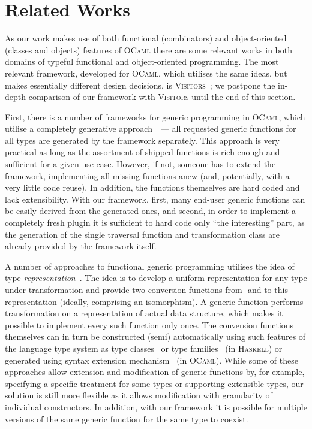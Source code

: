 \section{Related Works}

As our work makes use of both functional (combinators) and object-oriented (classes and objects) features of \textsc{OCaml} there are some relevant works
in both domains of typeful functional and object-oriented programming. The most relevant framework, developed for \textsc{OCaml}, which utilises the same
ideas, but makes essentially different design decisions, is \textsc{Visitors}~\cite{Visitors}; we postpone the in-depth comparison of our framework with
\textsc{Visitors} until the end of this section.

First, there is a number of frameworks for generic programming in \textsc{OCaml}, which utilise a completely generative approach~\cite{Yallop,PPXLib}~---
all requested generic functions for all types are generated by the framework separately. This approach is very practical as long as the assortment
of shipped functions is rich enough and sufficient for a given use case. However, if not, someone has to extend the framework, implementing
all missing functions anew (and, potentially, with a very little code reuse). In addition, the functions themselves are hard coded and
lack extensibility. With our framework, first, many end-user generic functions can be easily derived from the generated ones, and second, in order to
implement a completely fresh plugin it is sufficient to hard code only ``the interesting'' part, as the generation of the single traversal
function and transformation class are already provided by the framework itself.

A number of approaches to functional generic programming utilises the idea of type \emph{representation}~\cite{Hinze}.
The idea is to develop a uniform representation for any type under transformation and provide two conversion functions from- and to this representation
(ideally, comprising an isomorphism). A generic function performs transformation on a representation of actual data structure, which makes it possible to
implement every such function only once. The conversion functions themselves can in turn be constructed (semi) automatically using such features of
the language type system as type classes~\cite{Hinze,ALaCarte} or type families~\cite{InstantGenerics} (in \textsc{Haskell}) or generated using syntax extension
mechanism~\cite{GenericOCaml} (in \textsc{OCaml}). While some of these approaches allow extension and modification of generic functions by, for example, specifying a
specific treatment for some types or supporting extensible types, our solution is still more flexible as it allows modification with granularity of individual
constructors. In addition, with our framework it is possible for multiple versions of the same generic function for the same type to coexist.

